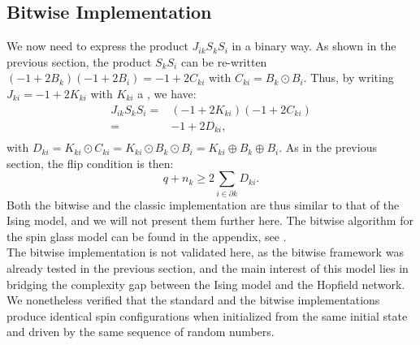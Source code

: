 \subsection{Bitwise Implementation}
We now need to express the product $J_{ik}S_kS_i$ in a binary way. As shown in the previous section, the product $S_kS_i$ can be re-written $(-1+2B_k)(-1+2B_i)=-1+2 C_{ki}$ with $C_{ki}= B_k \odot B_i$. Thus, by writing $J_{ki}=-1+2K_{ki}$ with $K_{ki}$ a \Bits, we have:
\begin{equation*}
  \begin{aligned}
  J_{ik}S_kS_i =& (-1+2K_{ki})(-1+2 C_{ki})\\
               =& -1 + 2D_{ki},\\
  \end{aligned}
\end{equation*}
with $D_{ki}=K_{ki}\odot C_{ki}= K_{ki} \odot B_k \odot B_i =  K_{ki} \oplus B_k \oplus B_i$. As in the previous section, the flip condition is then:
\begin{equation}
 q+ n_k \geq 2 \sum_{i \in \partial k}D_{ki}.
  \label{eq:flip_SG_bitwise}
\end{equation}
Both the bitwise and the classic implementation are thus similar to that of the Ising model, and we will not present them further here. The bitwise algorithm for the spin glass model can be found in the appendix, see .\\
The bitwise implementation is not validated here, as the bitwise framework was already tested in the previous section, and the main interest of this model lies in bridging the complexity gap between the Ising model and the Hopfield network. We nonetheless verified that the standard and the bitwise implementations produce identical spin configurations when initialized from the same initial state and driven by the same sequence of random numbers.
